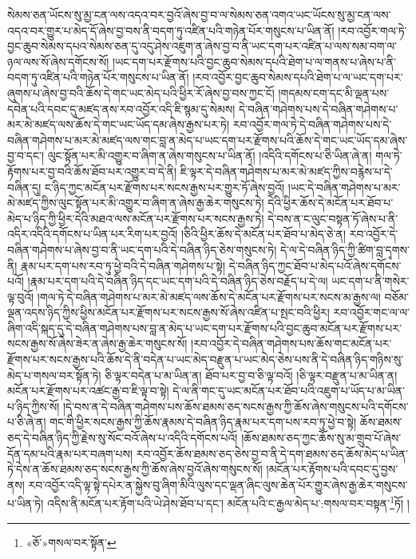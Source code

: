 སེམས་ཅན་ཡོངས་སུ་མྱ་ངན་ལས་འདའ་བར་བྱའོ་ཞེས་བྱ་བ་ལ་སེམས་ཅན་འགའ་ཡང་ཡོངས་སུ་མྱ་ངན་ལས་འདའ་བར་གྱུར་པ་མེད་དོ་ཞེས་བྱ་བས་ནི་བདག་ཏུ་འཛིན་པའི་གཉེན་པོར་གསུངས་པ་ཡིན་ནོ། །རབ་འབྱོར་གལ་ཏེ་བྱང་ཆུབ་སེམས་དཔའ་སེམས་ཅན་དུ་འདུ་ཤེས་འཇུག་ན་ཞེས་བྱ་བ་ནི་ཡང་དག་པར་འཛིན་པ་ལས་སམ་བག་ལ་ཉལ་ལས་སོ་ཞེས་དགོངས་སོ། །ཡང་དག་པར་རྫོགས་པའི་བྱང་ཆུབ་སེམས་དཔའི་ཐེག་པ་ལ་གནས་པ་ཞེས་པ་ནི་བདག་ཏུ་འཛིན་པའི་གཉེན་པོར་གསུངས་པ་ཡིན་ནོ། །རབ་འབྱོར་བྱང་ཆུབ་སེམས་དཔའི་ཐེག་པ་ལ་ཡང་དག་པར་ཞུགས་པ་ཞེས་བྱ་བའི་ཆོས་དེ་གང་ཡང་མེད་པའི་ཕྱིར་རོ་ཞེས་བྱ་བས་ཀྱང་ངོ། །གདམས་ངག་དང་མི་ལྡན་པས་དབེན་པའི་དབང་དུ་མཛད་ནས་རབ་འབྱོར་འདི་ཇི་སྙམ་དུ་སེམས། དེ་བཞིན་གཤེགས་པས་དེ་བཞིན་གཤེགས་པ་མར་མེ་མཛད་ལས་ཆོས་དེ་གང་ཡང་ཡོད་དམ་ཞེས་རྒྱས་པར་ཏེ། རབ་འབྱོར་གལ་ཏེ་དེ་བཞིན་གཤེགས་པས་དེ་བཞིན་གཤེགས་པ་མར་མེ་མཛད་ལས་གང་བླ་ན་མེད་པ་ཡང་དག་པར་རྫོགས་པའི་ཆོས་དེ་གང་ཡང་ཡོད་དམ་ཞེས་བྱ་བ་དང་། ལུང་སྟོན་པར་མི་འགྱུར་བ་ཞིག་ན་ཞེས་གསུངས་པ་ཡིན་ནོ། །འདིའི་དགོངས་པ་ཅི་ཡིན་ཞེ་ན། གལ་ཏེ་རྟོགས་པར་བྱ་བའི་ཆོས་ཐོབ་པར་འགྱུར་བ་དེ་ནི། ཇི་ལྟར་དེ་བཞིན་གཤེགས་པ་མར་མེ་མཛད་ཀྱིས་བརྙེས་པ་དེ་བཞིན་དུ། ང་ཉིད་ཀྱང་མངོན་པར་རྫོགས་པར་སངས་རྒྱས་པར་གྱུར་ཏོ་ཞེས་བྱའོ། །ཡང་དེ་བཞིན་གཤེགས་པ་མར་མེ་མཛད་ཀྱིས་ལུང་སྟོན་པར་མི་འགྱུར་བ་ཞིག་ན་ཞེས་རྒྱ་ཆེར་གསུངས་ཏེ། དེའི་ཕྱིར་ཆོས་དེ་མངོན་པར་ཐོབ་པ་མེད་པ་ཉིད་ཀྱི་ཕྱིར་དེའི་མཐའ་ལས་མངོན་པར་རྫོགས་པར་སངས་རྒྱས་ཏེ། དེ་བས་ན་ང་ལུང་བསྟན་ཏོ་ཞེས་པ་ནི་འདིར་འདིའི་དགོངས་པ་ཡིན་པར་རིག་པར་བྱའོ། །ཅིའི་ཕྱིར་ཆོས་དེ་མངོན་པར་ཐོབ་པ་མེད་ཅེ་ན། རབ་འབྱོར་དེ་བཞིན་གཤེགས་པ་ཞེས་བྱ་བ་ནི་ཡང་དག་པའི་དེ་བཞིན་ཉིད་ཅེས་གསུངས་ཏེ། དེ་ལ་དེ་བཞིན་ཉིད་ཀྱི་ཚིག་བླ་དྭགས་ནི། རྣམ་པར་དག་པས་རབ་ཏུ་ཕྱེ་བའི་དེ་བཞིན་གཤེགས་པ་སྟེ། དེ་བཞིན་ཉིད་ཀྱང་ཐོབ་པ་མེད་པའོ་ཞེས་དགོངས་པའོ། །རྣམ་པར་དག་པའི་དེ་བཞིན་ཉིད་དང་ཡང་དག་པའི་དེ་བཞིན་ཉིད་ཅེས་བརྗོད་པ་དེ་ལ། ཡང་དག་པ་ནི་གསེར་ལྟ་བུའོ། །གལ་ཏེ་དེ་བཞིན་གཤེགས་པ་མར་མེ་མཛད་ལས་ཆོས་དེ་མངོན་པར་རྫོགས་པར་སངས་མ་རྒྱས་ལ། བཅོམ་ལྡན་འདས་ཉིད་ཀྱིས་ཕྱིས་མངོན་པར་རྫོགས་པར་སངས་རྒྱས་སོ་ཞེས་འཛིན་པ་སྤང་བའི་ཕྱིར། རབ་འབྱོར་གང་ལ་ལ་ཞིག་འདི་སྐད་དུ་དེ་བཞིན་གཤེགས་པས་བླ་ན་མེད་པ་ཡང་དག་པར་རྫོགས་པའི་བྱང་ཆུབ་མངོན་པར་རྫོགས་པར་སངས་རྒྱས་སོ་ཞེས་ཟེར་ན་ཞེས་རྒྱ་ཆེར་གསུངས་སོ། །རབ་འབྱོར་དེ་བཞིན་གཤེགས་པས་ཆོས་གང་མངོན་པར་རྫོགས་པར་སངས་རྒྱས་པའི་ཆོས་དེ་ནི་བདེན་པ་ཡང་མེད་བརྫུན་པ་ཡང་མེད་ཅེས་པས་ནི་དེ་བཞིན་ཉིད་གཉིས་སུ་མེད་པ་གསལ་བར་སྟོན་ཏེ། ཅི་ལྟར་བདེན་པ་མ་ཡིན་ན། ཐོབ་པར་བྱ་བ་ཅི་ལྟ་བའོ། །ཅི་ལྟར་བརྫུན་པ་མ་ཡིན་ན། མངོན་པར་རྫོགས་པར་འཚང་རྒྱ་བ་ཇི་ལྟ་བ་སྟེ། དེ་ལ་ནི་གང་དུ་ཡང་མངོན་པར་ཐོབ་པའི་འཇུག་པ་ཡོད་པ་མ་ཡིན་པ་ཉིད་ཀྱིས་སོ། །དེ་བས་ན་དེ་བཞིན་གཤེགས་པས་ཆོས་ཐམས་ཅད་སངས་རྒྱས་ཀྱི་ཆོས་ཞེས་གསུངས་པའི་དགོངས་པ་ཅི་ཞེ་ན། གང་གི་ཕྱིར་སངས་རྒྱས་ཀྱི་ཆོས་རྣམས་དེ་བཞིན་ཉིད་རྣམ་པར་དག་པས་རབ་ཏུ་ཕྱེ་བ་སྟེ། ཆོས་ཐམས་ཅད་དེ་བཞིན་ཉིད་ཀྱི་རྗེས་སུ་སོང་བའོ་ཞེས་པ་འདིའི་དགོངས་པའོ། །ཆོས་ཐམས་ཅད་ཀྱང་ཆོས་སུ་མ་གྲུབ་པོ་ཞེས་དོན་དམ་པའི་རྣམ་པར་བཞག་པས། རབ་འབྱོར་ཆོས་ཐམས་ཅད་ཅེས་བྱ་བ་ནི་དེ་དག་ཐམས་ཅད་ཆོས་མེད་པ་ཡིན་ཏེ་དེས་ན་ཆོས་ཐམས་ཅད་སངས་རྒྱས་ཀྱི་ཆོས་ཞེས་བྱའོ་ཞེས་གསུངས་སོ། །མངོན་པར་རྟོགས་པའི་དབང་དུ་བྱས་ནས། རབ་འབྱོར་འདི་ལྟ་སྟེ་དཔེར་ན་སྐྱེས་བུ་ཞིག་མིའི་ལུས་དང་ལྡན་ཞིང་ལུས་ཆེན་པོར་གྱུར་ཞེས་རྒྱ་ཆེར་གསུངས་པ་ཡིན་ཏེ། འདིས་ནི་མངོན་པར་རྟོག་པའི་ཡེ་ཤེས་ཐོབ་པ་དང་། མངོན་པའི་ང་རྒྱལ་མེད་པ་:གསལ་བར་བསྟན་\footnote{«ཅོ་»གསལ་བར་སྟོན་}ཏོ། །
